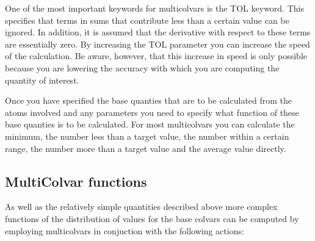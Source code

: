 One of the most important keywords for multicolvars is the T\+O\+L keyword. This specifies that terms in sums that contribute less than a certain value can be ignored. In addition, it is assumed that the derivative with respect to these terms are essentially zero. By increasing the T\+O\+L parameter you can increase the speed of the calculation. Be aware, however, that this increase in speed is only possible because you are lowering the accuracy with which you are computing the quantity of interest.

Once you have specified the base quanties that are to be calculated from the atoms involved and any parameters you need to specify what function of these base quanties is to be calculated. For most multicolvars you can calculate the minimum, the number less than a target value, the number within a certain range, the number more than a target value and the average value directly.\hypertarget{mcolv_multicolvarfunction}{}\subsection{Multi\+Colvar functions}\label{mcolv_multicolvarfunction}
As well as the relatively simple quantities described above more complex functions of the distribution of values for the base colvars can be computed by employing multicolvars in conjuction with the following actions\+:

